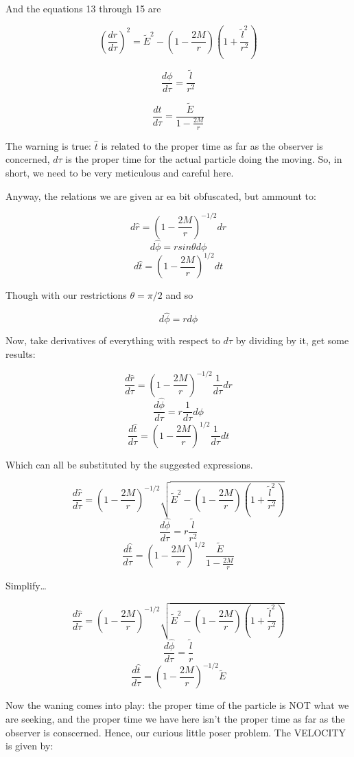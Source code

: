 \documentclass[landscape,letterpaper,10pt,english]{article}
\begin{document}
    And the equations 13 through 15 are

\[ \left( \frac{dr}{d\tau} \right)^2 = \tilde E^2 - \left( 1-\frac{2M}{r} \right) \left( 1+\frac{\tilde l^2}{r^2} \right)\]

\[ \frac{d\phi}{d \tau} = \frac{\tilde l}{r^2} \]

\[ \frac{dt}{d\tau} = \frac{\tilde E}{1-\frac{2M}{r}} \]

    The warning is true: \(\hat t\) is related to the proper time as far as
the observer is concerned, \(d\tau\) is the proper time for the actual
particle doing the moving. So, in short, we need to be very meticulous
and careful here.

Anyway, the relations we are given ar ea bit obfuscated, but ammount to:

\[ d\hat r  = \left( 1-\frac{2M}{r} \right)^{-1/2} dr\]
\[ d\hat \phi  = rsin\theta d \phi\]
\[ d\hat t  = \left( 1-\frac{2M}{r} \right)^{1/2} dt\]

Though with our restrictions \(\theta = \pi/2\) and so

\[ d\hat \phi  = r d \phi\]

    Now, take derivatives of everything with respect to \(d\tau\) by
dividing by it, get some results:

\[ \frac{d\hat r}{d \tau}  = \left( 1-\frac{2M}{r} \right)^{-1/2} \frac{1}{d\tau}dr \]
\[ \frac{d\hat \phi}{d\tau}  = r \frac{1}{d\tau}d \phi\]
\[ \frac{d\hat t}{d\tau}  = \left( 1-\frac{2M}{r} \right)^{1/2} \frac{1}{d\tau} dt \]

Which can all be substituted by the suggested expressions.

\[ \frac{d\hat r}{d \tau}  = \left( 1-\frac{2M}{r} \right)^{-1/2} \sqrt{\tilde E^2 - \left( 1-\frac{2M}{r} \right) \left( 1+\frac{\tilde l^2}{r^2} \right)} \]
\[ \frac{d\hat \phi}{d\tau}  = r \frac{\tilde l}{r^2}\]
\[ \frac{d\hat t}{d\tau}  = \left( 1-\frac{2M}{r} \right)^{1/2} \frac{\tilde E}{1-\frac{2M}{r}} \]

    Simplify\ldots{}

\[ \frac{d\hat r}{d \tau}  = \left( 1-\frac{2M}{r} \right)^{-1/2} \sqrt{\tilde E^2 - \left( 1-\frac{2M}{r} \right) \left( 1+\frac{\tilde l^2}{r^2} \right)} \]
\[ \frac{d\hat \phi}{d\tau}  = \frac{\tilde l}{r}\]
\[ \frac{d\hat t}{d\tau}  = \left( 1-\frac{2M}{r} \right)^{-1/2} \tilde E \]

    Now the waning comes into play: the proper time of the particle is NOT
what we are seeking, and the proper time we have here isn't the proper
time as far as the observer is conscerned. Hence, our curious little
poser problem. The VELOCITY is given by:
\end{document}
